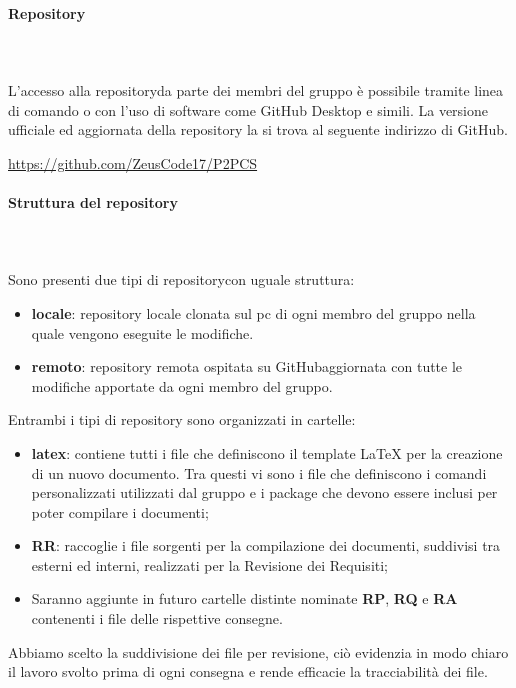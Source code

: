	\paragraph{Repository} \mbox{}\\ \mbox{}\\
	L'accesso alla repository\glosp da parte dei membri del gruppo è possibile tramite linea di comando o con l'uso di software come GitHub Desktop e simili.
	La versione ufficiale ed aggiornata della repository la si trova al seguente indirizzo di GitHub\glo. \newline \newline
	\centerline{\url{https://github.com/ZeusCode17/P2PCS}}
	\paragraph{Struttura del repository} \mbox{}\\ \mbox{}\\
	Sono presenti due tipi di repository\glosp con uguale struttura:
	\begin{itemize}
		\item \textbf{locale}: repository locale clonata sul pc di ogni membro del gruppo nella quale vengono eseguite le modifiche.
		\item \textbf{remoto}: repository remota ospitata su GitHub\glosp aggiornata con tutte le modifiche apportate da ogni membro del gruppo.
	\end{itemize}			
	Entrambi i tipi di repository sono organizzati in cartelle:
	\begin{itemize}
		\item \textbf{latex}: contiene tutti i file che definiscono il template \LaTeX{} per la creazione di un nuovo documento. Tra questi vi sono i file che definiscono i comandi personalizzati utilizzati dal gruppo e i package che devono essere inclusi per poter compilare i documenti;
		\item \textbf{RR}: raccoglie i file sorgenti per la compilazione dei documenti, suddivisi tra esterni ed interni, realizzati per la Revisione dei Requisiti;
		\item Saranno aggiunte in futuro cartelle distinte nominate \textbf{RP}, \textbf{RQ} e \textbf{RA} contenenti i file delle rispettive consegne.
	\end{itemize}
	Abbiamo scelto la suddivisione dei file per revisione, ciò evidenzia in modo chiaro il lavoro svolto prima di ogni consegna e rende efficacie la tracciabilità dei file.
